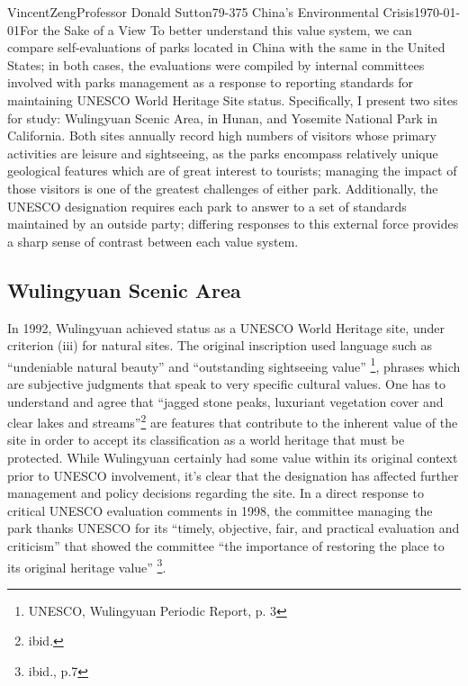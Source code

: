 \documentclass[12pt]{article}
\begin{document}
\begin{mla}{Vincent}{Zeng}{Professor Donald Sutton}{79-375 China's Environmental Crisis}{\today}{For the Sake of a View}
To better understand this value system, we can compare self-evaluations of
parks located in China with the same in the United States; in both cases, the
evaluations were compiled by internal committees involved with parks
management as a response to reporting standards for maintaining UNESCO World
Heritage Site status. Specifically, I present two sites for study: Wulingyuan Scenic Area,
in Hunan, and Yosemite National Park in California. Both sites annually
record high numbers of visitors whose primary activities are leisure and
sightseeing, as the parks encompass relatively unique geological features which
are of great interest to tourists; managing the impact of those visitors is one
of the greatest challenges of either park. Additionally, the UNESCO designation
requires each park to answer to a set of standards maintained by an outside
party; differing responses to this external force provides a sharp sense of
contrast between each value system.

\subsection*{Wulingyuan Scenic Area}

In 1992, Wulingyuan achieved status as a UNESCO World Heritage site, under
criterion (iii) for natural sites. The original inscription used language
such as ``undeniable natural beauty'' and ``outstanding sightseeing value''
\footnote{UNESCO, Wulingyuan Periodic Report, p. 3}, phrases which are
subjective judgments that speak to very specific cultural values. One has
to understand and agree that ``jagged stone peaks, luxuriant vegetation cover and clear
lakes and streams''\footnote{ibid.} are features that contribute to the
inherent value of the site in order to accept its classification as a
world heritage that must be protected. While Wulingyuan certainly had some
value within its original context prior to UNESCO involvement, it's
clear that the designation has affected further management and policy
decisions regarding the site. In a direct response to critical UNESCO evaluation
comments in 1998, the committee managing the park thanks UNESCO for its
``timely, objective, fair, and practical evaluation and criticism'' that
showed the committee ``the importance of restoring the place to its original
heritage value'' \footnote{ibid., p.7}.


\end{mla}
\end{document}
